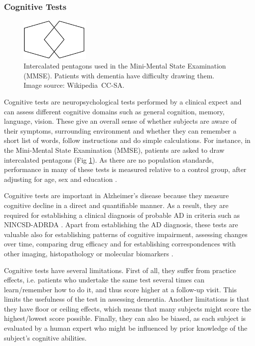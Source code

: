\subsubsection{Cognitive Tests}
\label{sec:bckCog}

\begin{figure}
\centering
\includegraphics[width=0.3\textwidth]{images/mmse_pentagons}
\caption[Intercalated pentagons used in the Mini-Mental State Examination (MMSE)]{Intercalated pentagons used in the Mini-Mental State Examination (MMSE). Patients with dementia have difficulty drawing them. Image source: Wikipedia\footnotemark \ CC-SA.}
\label{fig:bckMmsePentagons}
\end{figure}

Cognitive tests are neuropsychological tests performed by a clinical expect and can assess different cognitive domains such as general cognition, memory, language, vision. These give an overall sense of whether subjects are aware of their symptoms, surrounding environment and whether they can remember a short list of words, follow instructions and do simple calculations. For instance, in the Mini-Mental State Examination (MMSE), patients are asked to draw intercalated pentagons (Fig \ref{fig:bckMmsePentagons}). As there are no population standards, performance in many of these tests is measured relative to a control group, after adjusting for age, sex and education \cite{mckhann1984clinical}.

Cognitive tests are important in Alzheimer's disease because they measure cognitive decline in a direct and quantifiable manner. As a result, they are required for establishing a clinical diagnosis of probable AD in criteria such as NINCSD-ADRDA \cite{dubois2007research,dubois2010revising}. Apart from establishing the AD diagnosis, these tests are valuable also for establishing patterns of cognitive impairment, assessing changes over time, comparing drug efficacy and for establishing correspondences with other imaging, histopathology or molecular biomarkers \cite{mckhann1984clinical}. 

Cognitive tests have several limitations. First of all, they suffer from practice effects, i.e. patients who undertake the same test several times can learn/remember how to do it, and thus score higher at a follow-up visit. This limits the usefulness of the test in assessing dementia. Another limitations is that they have floor or ceiling effects, which means that many subjects might score the highest/lowest score possible. Finally, they can also be biased, as each subject is evaluated by a human expert who might be influenced by prior knowledge of the subject's cognitive abilities.


